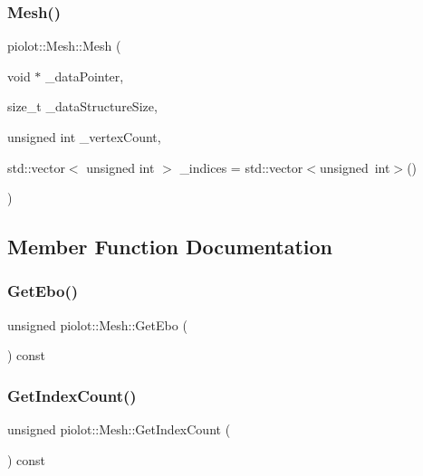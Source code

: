\subsubsection{\texorpdfstring{Mesh()}{Mesh()}}
{\footnotesize\ttfamily piolot\+::\+Mesh\+::\+Mesh (\begin{DoxyParamCaption}\item[{void $\ast$}]{\+\_\+data\+Pointer,  }\item[{size\+\_\+t}]{\+\_\+data\+Structure\+Size,  }\item[{unsigned int}]{\+\_\+vertex\+Count,  }\item[{std\+::vector$<$ unsigned int $>$}]{\+\_\+indices = {\ttfamily std\+:\+:vector$<$unsigned~int$>$()} }\end{DoxyParamCaption})\hspace{0.3cm}{\ttfamily [explicit]}}



\subsection{Member Function Documentation}
\mbox{\label{classpiolot_1_1_mesh_afe44ffdc27bc839ec6139f801e2efae9}} 
\subsubsection{\texorpdfstring{Get\+Ebo()}{GetEbo()}}
{\footnotesize\ttfamily unsigned piolot\+::\+Mesh\+::\+Get\+Ebo (\begin{DoxyParamCaption}{ }\end{DoxyParamCaption}) const\hspace{0.3cm}{\ttfamily [inline]}}

\mbox{\label{classpiolot_1_1_mesh_aaeaf1e4a7ed7fff6c27103393077c6f3}} 
\subsubsection{\texorpdfstring{Get\+Index\+Count()}{GetIndexCount()}}
{\footnotesize\ttfamily unsigned piolot\+::\+Mesh\+::\+Get\+Index\+Count (\begin{DoxyParamCaption}{ }\end{DoxyParamCaption}) const\hspace{0.3cm}{\ttfamily [inline]}}

